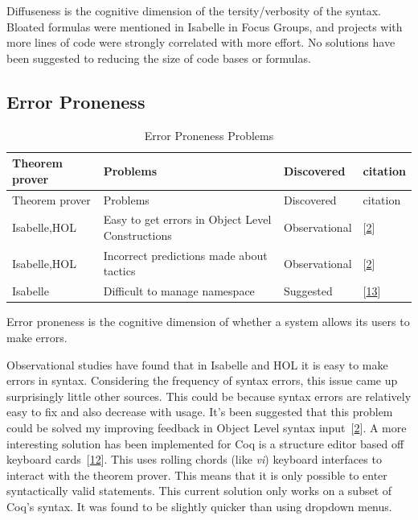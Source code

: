 \documentclass[
]{article}
\begin{document}
Diffuseness is the cognitive dimension of the tersity/verbosity of the
syntax. Bloated formulas were mentioned in Isabelle in Focus Groups, and
projects with more lines of code were strongly correlated with more
effort. No solutions have been suggested to reducing the size of code
bases or formulas.

\hypertarget{error-proneness-1}{%
\subsection{Error Proneness}\label{error-proneness-1}}

\hypertarget{tbl:error_proneness}{}
\begin{longtable}[]{@{}llll@{}}
\caption{\label{tbl:error_proneness}Error Proneness
Problems}\tabularnewline
\toprule
Theorem prover & Problems & Discovered & citation \\
\midrule
\endfirsthead
\toprule
Theorem prover & Problems & Discovered & citation \\
\midrule
\endhead
Isabelle,HOL & Easy to get errors in Object Level Constructions &
Observational & {[}\protect\hyperlink{ref-aitken_analysis_2000}{2}{]} \\
Isabelle,HOL & Incorrect predictions made about tactics & Observational
& {[}\protect\hyperlink{ref-aitken_analysis_2000}{2}{]} \\
Isabelle & Difficult to manage namespace & Suggested &
{[}\protect\hyperlink{ref-bourke_challenges_2012}{13}{]} \\
\bottomrule
\end{longtable}

Error proneness is the cognitive dimension of whether a system allows
its users to make errors.

Observational studies have found that in Isabelle and HOL it is easy to
make errors in syntax. Considering the frequency of syntax errors, this
issue came up surprisingly little other sources. This could be because
syntax errors are relatively easy to fix and also decrease with usage.
It's been suggested that this problem could be solved my improving
feedback in Object Level syntax
input~{[}\protect\hyperlink{ref-aitken_analysis_2000}{2}{]}. A more
interesting solution has been implemented for Coq is a structure editor
based off keyboard
cards~{[}\protect\hyperlink{ref-berman_development_2014}{12}{]}. This
uses rolling chords (like \emph{vi}) keyboard interfaces to interact
with the theorem prover. This means that it is only possible to enter
syntactically valid statements. This current solution only works on a
subset of Coq's syntax. It was found to be slightly quicker than using
dropdown menus.
\end{document}
